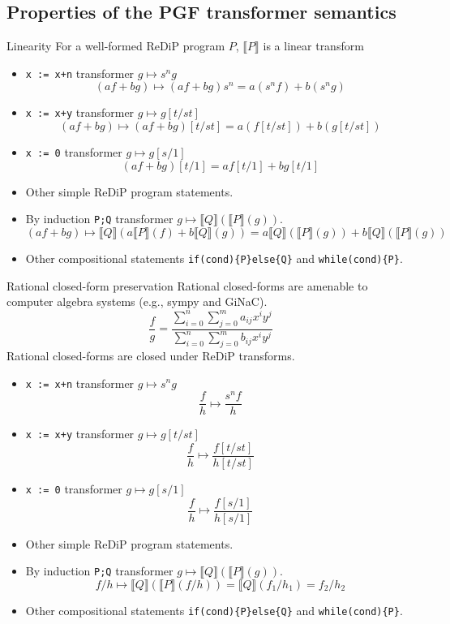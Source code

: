 \documentclass[8pt]{beamer}
\renewcommand{\S}[1]{ \llbracket #1 \rrbracket }
\begin{document}
\subsection{Properties of the PGF transformer semantics}
\begin{frame}{Linearity}
	For a well-formed ReDiP program \(P\), \(\S{P}\) is a linear transform
	\begin{itemize}
		\item \texttt{x := x+n} transformer \(g\mapsto s^n g\)
		      \[
			      (af + bg) \mapsto (af + bg)s^n = a(s^n f) + b(s^n g)
		      \]
		\item \texttt{x := x+y} transformer \(g\mapsto g[t/st]\)
		      \[
			      (af + bg) \mapsto (af + bg)[t/st] = a(f[t/st]) + b(g[t/st])
		      \]
		\item \texttt{x := 0} transformer \(g\mapsto g[s/1]\)
		      \[
			      (af + bg)[t/1] = af[t/1] + bg[t/1]
		      \]
		\item Other simple ReDiP program statements.
		\item By induction \texttt{P;Q} transformer \(g\mapsto \S{Q}(\S{P}(g))\).
		      \[
			      (af+bg) \mapsto \S{Q}(a\S{P}(f) + b\S{Q}(g)) = a\S{Q}(\S{P}(g)) + b \S{Q}(\S{P}(g))
		      \]
		\item Other compositional statements \texttt{if(cond)\{P\}else\{Q\}} and \texttt{while(cond)\{P\}}.
	\end{itemize}
\end{frame}
\begin{frame}{Rational closed-form preservation}
	Rational closed-forms are amenable to computer algebra systems (e.g., sympy and GiNaC).
	\[
		\frac{f}{g} = \dfrac
		{ \sum_{i=0}^n\sum_{j=0}^m a_{ij} x^iy^j }
		{ \sum_{i=0}^n\sum_{j=0}^m b_{ij} x^iy^j }
	\]
	Rational closed-forms are closed under ReDiP transforms.
	\begin{itemize}
		\item \texttt{x := x+n} transformer \(g\mapsto s^n g\)
		      \[
			      \frac{f}{h} \mapsto \frac{s^n f}{h}
		      \]
		\item \texttt{x := x+y} transformer \(g\mapsto g[t/st]\)
		      \[
			      \frac{f}{h} \mapsto \frac{f[t/st]}{h[t/st]}
		      \]
		\item \texttt{x := 0} transformer \(g\mapsto g[s/1]\)
		      \[
			      \frac{f}{h} \mapsto \frac{f[s/1]}{h[s/1]}
		      \]
		\item Other simple ReDiP program statements.
		\item By induction \texttt{P;Q} transformer \(g\mapsto \S{Q}(\S{P}(g))\).
		      \[
			      f/h \mapsto \S{Q}(\S{P}(f/h)) = \S{Q}(f_1/h_1) = f_2/h_2
		      \]
		\item Other compositional statements \texttt{if(cond)\{P\}else\{Q\}} and \texttt{while(cond)\{P\}}.
	\end{itemize}
\end{frame}
\end{document}
